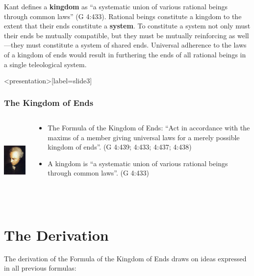 Kant defines a \textbf{kingdom} as ``a systematic union of various rational beings through common laws'' (G 4:433). Rational beings constitute a kingdom to the extent that their ends constitute a \textbf{system}. To constitute a system not only must their ends be mutually compatible, but they must be mutually reinforcing as well---they must constitute a system of shared ends. Universal adherence to the laws of a kingdom of ends would result in furthering the ends of all rational beings in a single teleological system. \change

\begin{frame}<presentation>[label=slide3]
    \frametitle{The Kingdom of Ends}
        \begin{columns}
            \begin{column}{3cm}
                \includegraphics[height=4cm]{../../../graphics/kant.jpg}
            \end{column}
            \begin{column}{7cm}
                \begin{itemize}
                    \item \alert{The Formula of the Kingdom of Ends}: ``Act in accordance with the maxims of a member giving universal laws for a merely possible kingdom of ends''. (G 4:439; 4:433; 4:437; 4:438)
                    \item A \alert{kingdom} is ``a systematic union of various rational beings through common laws''. (G 4:433)
                \end{itemize}
            \end{column}
        \end{columns}
\end{frame}

\section{The Derivation}

The derivation of the Formula of the Kingdom of Ends draws on ideas expressed in all previous formulas:

